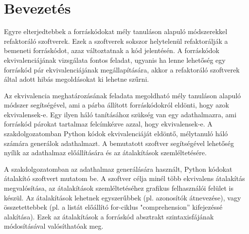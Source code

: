 \chapter{Bevezetés}
\label{ch:intro}

Egyre elterjedtebbek a forráskódokat mély tanuláson alapuló módszerekkel refaktoráló szoftverek. Ezek a szoftverek sokszor helytelenül refaktorálják a bemeneti forráskódot, azaz változtatnak a kód jelentésén. A forráskódok ekvivalenciájának vizsgálata fontos feladat, ugyanis ha lenne lehetőség egy forráskód pár ekvivalenciájának megállapítására, akkor a refaktoráló szoftverek által adott hibás megoldásokat ki lehetne szűrni.

Az ekvivalencia meghatározásának feladata megoldható mély tanuláson alapuló módszer segítségével, ami a párba állított forráskódokról eldönti, hogy azok ekvivalensek-e. Egy ilyen háló tanításához szükség van egy adathalmazra, ami forráskód párokat tartalmaz felcímkézve azzal, hogy ekvivalensek-e. A szakdolgozatomban Python kódok ekvivalenciáját eldöntő, mélytanuló háló számára generálok adathalmazt. A bemutatott szoftver segítségével lehetőség nyílik az adathalmaz előállítására és az átalakítások szemléltetésére.

A szakdolgozatomban az adathalmaz generálására használt, Python kódokat átalakító szoftvert mutatom be. A szoftver célja minél több ekvivalens átalakítás megvalósítása, az átalakítások szemléltetéséhez grafikus felhasználói felület is készül. Az átalakítások lehetnek egyszerűbbek (pl. azonosítók átnevezése), vagy összetettebbek (pl. a listát előállító for-ciklus "comprehension” kifejezéssé alakítása). Ezek az átalakítások a forráskód absztrakt szintaxisfájának módosításával valósíthatóak meg.
